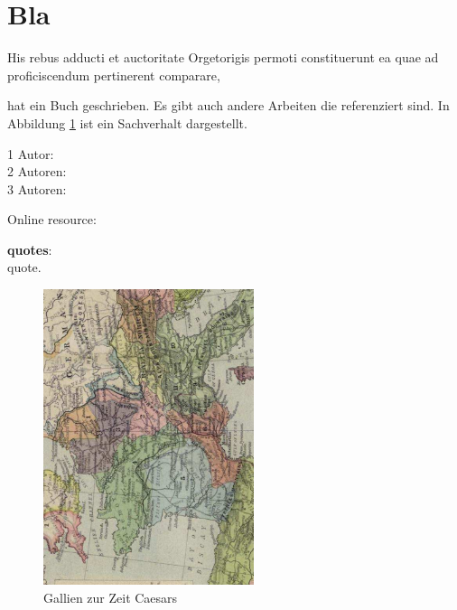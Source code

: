 \section{Bla} \raggedbottom 

His rebus adducti et auctoritate Orgetorigis permoti constituerunt
ea quae ad proficiscendum pertinerent comparare,

\citet{Con97} hat ein Buch geschrieben. Es gibt auch andere Arbeiten \citep{PeHe97} die referenziert sind. In Abbildung \ref{fig_Gallien} ist ein Sachverhalt dargestellt.


1 Autor: \citet{Con97} \hspace*{1cm} \citep{Con97}\\
2 Autoren: \citet{IWNLP} \hspace*{1cm} \citep{IWNLP}\\
3 Autoren: \citet{liebeck-esau-conrad:2016:ArgMining2016} \hspace*{1cm} \citep{liebeck-esau-conrad:2016:ArgMining2016}

Online resource: \citet{ILSVRC2016}

\textbf{quotes}:\\
\glqq quote\grqq.

\begin{figure}[htb]
\begin{center}
  \includegraphics[width=175pt, angle=270]{bilder/Galia}
  \caption{Gallien zur Zeit Caesars}\label{fig_Gallien}
\end{center}
\end{figure}


